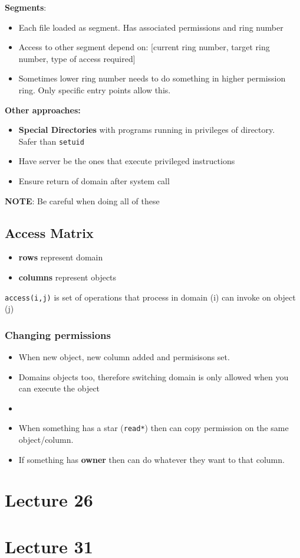 \documentclass{article}
\begin{document}
		\textbf{Segments}:
		\begin{itemize}
			\item Each file loaded as segment. Has associated permissions and ring number
			\item Access to other segment depend on: [current ring number, target ring number, type of access required]
			\item Sometimes lower ring number needs to do something in higher permission ring. Only specific entry points allow this.
		\end{itemize}
		
		\textbf{Other approaches:}
		\begin{itemize}
			\item \textbf{Special Directories} with programs running in privileges of directory. \\Safer than \texttt{setuid}
			\item Have server be the ones that execute privileged instructions
			\item Ensure return of domain after system call
		\end{itemize}
		\textbf{NOTE}: Be careful when doing all of these
		
	\subsection{Access Matrix}
		\begin{itemize}
			\item \textbf{rows} represent domain
			\item \textbf{columns} represent objects
		\end{itemize}
		
		\texttt{access(i,j)} is set of operations that process in domain (i) can invoke on object (j)
		
		\subsubsection{Changing permissions}
			\begin{itemize}
				\item When new object, new column added and permisisons set.
				\item Domains objects too, therefore switching domain is only allowed when you can execute the object
				\item 
				\item When something has a star (\texttt{read*}) then can copy permission on the same object/column. 
				\item If something has \textbf{owner} then can do whatever they want to that column.
			\end{itemize}
			
	
\section{Lecture 26}
	
	
	
	
	
	
	
\section{Lecture 31}
	
\end{document}
